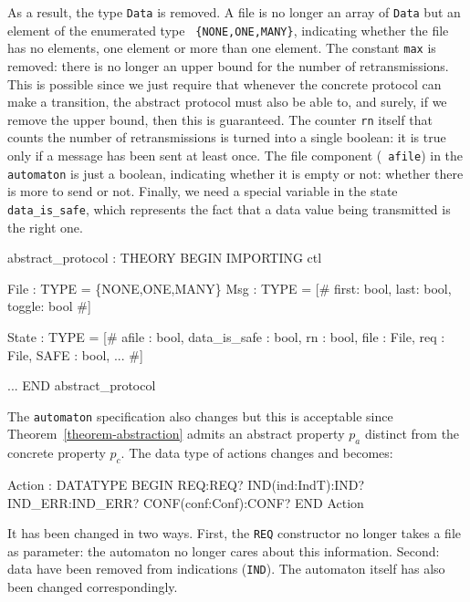 As a result, the type {\tt  Data} is removed.   A file is no longer an
array of {\tt   Data}  but an element  of   the enumerated type   {\tt
\{NONE,ONE,MANY\}},  indicating whether the  file has no elements, one
element or more than one element.  The  constant {\tt max} is removed:
there   is  no   longer     an upper    bound for   the     number  of
retransmissions. This is possible since we  just require that whenever
the concrete protocol can  make  a transition, the abstract   protocol
must also be  able to, and surely, if  we remove the upper bound, then
this is guaranteed. The counter {\tt rn} itself that counts the number
of retransmissions is turned into a single boolean: it is true only if
a message  has been  sent at least  once.    The file component  ({\tt
afile}) in the {\tt automaton}  is just a boolean, indicating  whether
it is empty or not: whether there is more to send or not.
Finally, we need a special variable in the state {\tt data\_is\_safe},
which represents the  fact that a data  value being transmitted is the
right one.

\begin{smallsession}
  abstract_protocol : THEORY 
  BEGIN
    IMPORTING ctl

    File : TYPE = \{NONE,ONE,MANY\}
    Msg  : TYPE = [# first: bool, last: bool, toggle: bool #]

    State : TYPE =
      [# afile        : bool,
         data_is_safe : bool,
         rn           : bool,
         file         : File,
         req          : File,
         SAFE         : bool,
         ...
      #]

    ...
  END abstract_protocol
\end{smallsession}


\vspace{0.5cm}

The {\tt automaton} specification  also changes but this is acceptable
since Theorem~\ref{theorem-abstraction}    admits an abstract property
$p_a$  distinct  from the concrete  property $p_c$.   The data type of
actions changes and becomes:

\begin{smallsession}
  Action : DATATYPE
    BEGIN
      REQ:REQ?
      IND(ind:IndT):IND?
      IND_ERR:IND_ERR?
      CONF(conf:Conf):CONF?
    END Action
\end{smallsession}

It has been changed in  two ways. First, the  {\tt REQ} constructor no
longer takes a file as parameter: the automaton  no longer cares about
this information.  Second: data  have  been removed   from indications
({\tt IND}). The automaton itself has also been changed correspondingly.

